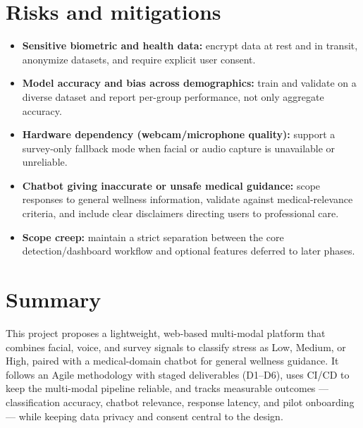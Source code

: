 \documentclass[11pt,a4paper]{article}
\begin{document}
\section{Risks and mitigations}
\begin{itemize}[leftmargin=0.7cm]
    \item \textbf{Sensitive biometric and health data:} encrypt data at rest and in transit, anonymize datasets, and require explicit user consent.
    \item \textbf{Model accuracy and bias across demographics:} train and validate on a diverse dataset and report per-group performance, not only aggregate accuracy.
    \item \textbf{Hardware dependency (webcam/microphone quality):} support a survey-only fallback mode when facial or audio capture is unavailable or unreliable.
    \item \textbf{Chatbot giving inaccurate or unsafe medical guidance:} scope responses to general wellness information, validate against medical-relevance criteria, and include clear disclaimers directing users to professional care.
    \item \textbf{Scope creep:} maintain a strict separation between the core detection/dashboard workflow and optional features deferred to later phases.
\end{itemize}

\section{Summary}
This project proposes a lightweight, web-based multi-modal platform that combines facial, voice, and survey signals to classify stress as Low, Medium, or High, paired with a medical-domain chatbot for general wellness guidance. It follows an Agile methodology with staged deliverables (D1--D6), uses CI/CD to keep the multi-modal pipeline reliable, and tracks measurable outcomes --- classification accuracy, chatbot relevance, response latency, and pilot onboarding --- while keeping data privacy and consent central to the design.
\end{document}
